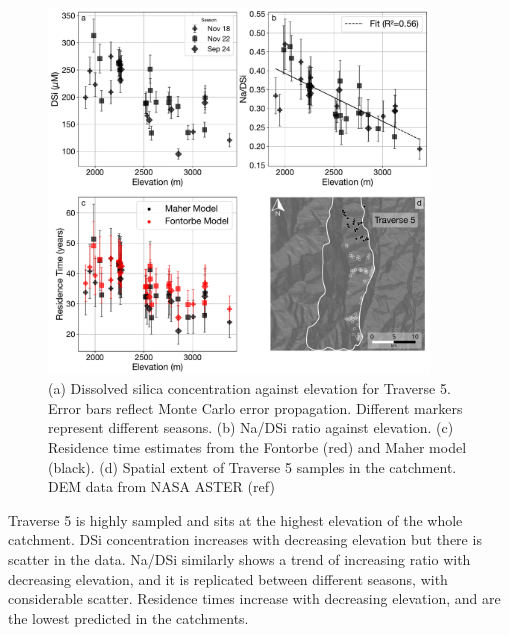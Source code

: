 \begin{figure}[h]
    \centering
        \includegraphics[width=0.9\textwidth]{Traverse_5_summary.pdf}
    \caption{(a) Dissolved silica concentration against elevation for Traverse 5. Error bars reflect Monte Carlo error propagation. Different markers represent different seasons. (b) Na/DSi ratio against elevation. (c) Residence time estimates from the Fontorbe (red) and Maher model (black). (d) Spatial extent of Traverse 5 samples in the catchment. DEM data from NASA ASTER (ref)}
    \label{fig:trav5}
\end{figure}

\FloatBarrier

Traverse 5 is highly sampled and sits at the highest elevation of the whole catchment. DSi concentration increases with decreasing elevation but there is scatter in the data. Na/DSi similarly shows a trend of increasing ratio with decreasing elevation, and it is replicated between different seasons, with considerable scatter. Residence times increase with decreasing elevation, and are the lowest predicted in the catchments.

\newpage

